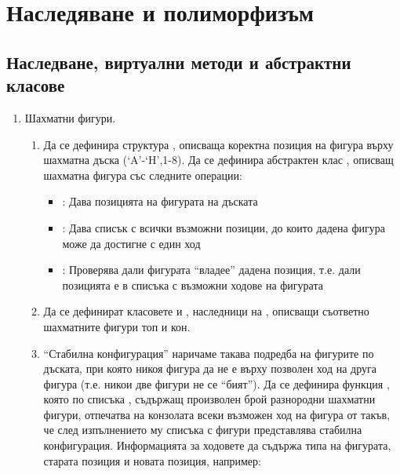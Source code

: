 \clearpage\section {Наследяване и полиморфизъм}

\subsection {Наследване, виртуални методи и абстрактни класове}

\begin{enumerate}


    \item Шахматни фигури.

    \begin{enumerate}[label=\alph*)]
      \item Да се дефинира структура , описваща коректна позиция на фигура върху шахматна дъска (‘A’-‘H’,1-8). Да се дефинира абстрактен клас , описващ шахматна фигура със следните операции:

      \begin{itemize}
      \item {}: Дава позицията на фигурата на дъската
      \item {}: Дава списък с всички възможни позиции, до които дадена фигура може да достигне с един ход
      \item {}: Проверява дали фигурата ``владее'' дадена позиция, т.е. дали позицията е в списъка с възможни ходове на фигурата
      \end{itemize}

      \item Да се дефинират класовете  и , наследници на , описващи съответно шахматните фигури топ и кон.

      \item ``Стабилна конфигурация'' наричаме такава подредба на фигурите по дъската, при която никоя фигура да не е върху позволен ход на друга фигура (т.е. никои две фигури не се ``бият''). Да се дефинира функция , която по списъка , съдържащ произволен брой разнородни шахматни фигури, отпечатва на конзолата всеки възможен ход на фигура от  такъв, че след изпълнението му списъка с фигури представлява стабилна конфигурация. Информацията за ходовете да съдържа типа на фигурата, старата позиция и новата позиция, например:


\end{enumerate}
\end{enumerate}
